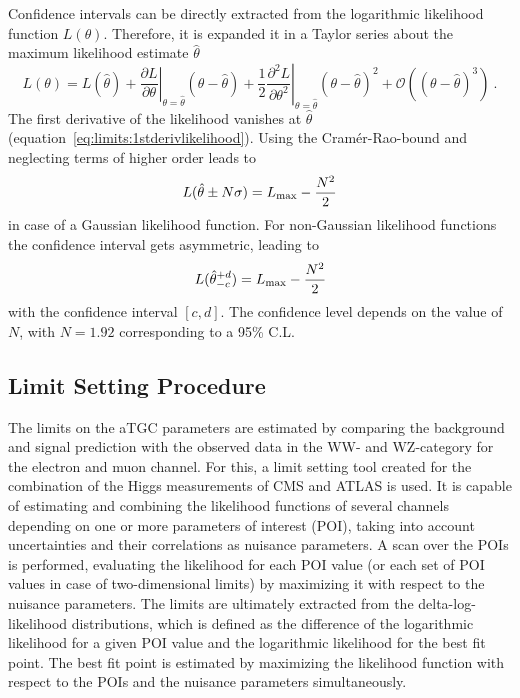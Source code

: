 Confidence intervals can be directly extracted from the logarithmic likelihood function $L(\theta)$. Therefore, it is expanded it in a Taylor series about the maximum likelihood estimate $\hat{\theta}$ \cite{cowan}
\begin{equation}
L(\theta) = L(\hat{\theta}) + \left. \frac{\partial L}{\partial \theta}\right|_{\theta=\hat{\theta}}(\theta-\hat{\theta}) + \frac{1}{2}\left.\frac{\partial^2L}{\partial \theta^2}\right|_{\theta=\hat{\theta}}(\theta-\hat{\theta})^2 + \mathcal{O}\left((\theta-\hat{\theta})^3\right) ~.
\label{eq:limits:liketaylor}
\end{equation}
The first derivative of the likelihood vanishes at $\hat{\theta}$ (equation~\ref{eq:limits:1stderivlikelihood}). Using the Cram\'{e}r-Rao-bound and neglecting terms of higher order leads to \cite{cowan}
\begin{equation}
L(\hat{\theta}\pm N\sigma) = L_{\rm max} - \frac{N^2}{2} 
\end{equation}
in case of a Gaussian likelihood function. For non-Gaussian likelihood functions the confidence interval gets asymmetric, leading to
\begin{equation}
L(\hat{\theta}_{-c}^{+d}) = L_{\rm max} - \frac{N^2}{2}
\end{equation}
with the confidence interval $[c,d]$. The confidence level depends on the value of $N$, with $N=1.92$ corresponding to a 95\% C.L.

\subsection{Limit Setting Procedure}
\label{subsec:limsetproc}
The limits on the aTGC parameters are estimated by comparing the background and signal prediction with the observed data in the WW- and WZ-category for the electron and muon channel. For this, a limit setting tool created for the combination of the Higgs measurements of CMS and ATLAS \cite{combine} is used. It is capable of estimating and combining the likelihood functions of several channels depending on one or more parameters of interest (POI), taking into account uncertainties and their correlations as nuisance parameters. A scan over the POIs is performed, evaluating the likelihood for each POI value (or each set of POI values in case of two-dimensional limits) by maximizing it with respect to the nuisance parameters. The limits are ultimately extracted from the delta-log-likelihood distributions, which is defined as the difference of the logarithmic likelihood for a given POI value and the logarithmic likelihood for the best fit point. The best fit point is estimated by maximizing the likelihood function with respect to the POIs and the nuisance parameters simultaneously.\\

